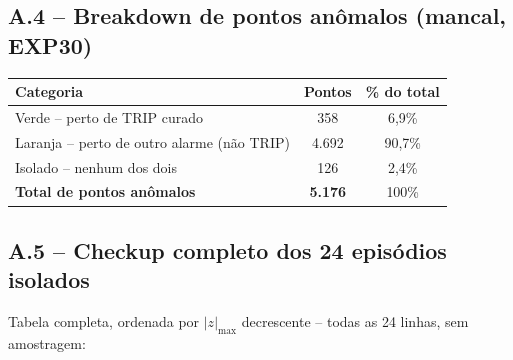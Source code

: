 \documentclass[11pt,a4paper]{article}
\begin{document}
\subsection{A.4 -- Breakdown de pontos anômalos (mancal, EXP30)}

\begin{table}[H]
\centering
\begin{tabular}{lcc}
\toprule
\textbf{Categoria} & \textbf{Pontos} & \textbf{\% do total} \\
\midrule
\textcolor{corVerde}{Verde} -- perto de TRIP curado & 358 & 6,9\% \\
\textcolor{corLaranja}{Laranja} -- perto de outro alarme (não TRIP) & 4.692 & 90,7\% \\
Isolado -- nenhum dos dois & 126 & 2,4\% \\
\midrule
\textbf{Total de pontos anômalos} & \textbf{5.176} & 100\% \\
\bottomrule
\end{tabular}
\end{table}

\subsection{A.5 -- Checkup completo dos 24 episódios isolados}

Tabela completa, ordenada por $|z|_{\max}$ decrescente -- todas as 24
linhas, sem amostragem:
\end{document}
